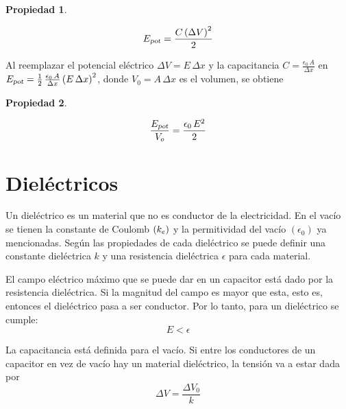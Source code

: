 \documentclass[a5paper,12pt,twoside]{book}
\newtheorem{prop}{{Propiedad}}[chapter]
\begin{document}
\begin{mdframed}[style=MyFrame1]
    \begin{prop}
    \end{prop}
    \begin{equation*}
        {{E}_\textsl{{pot}}} = \frac{C \left(\Delta V\right)^2}{2}
    \end{equation*}
\end{mdframed}

Al reemplazar el potencial eléctrico $\Delta V = E \, \Delta x$ y la capacitancia $C = \tfrac{\epsilon_0 \, A}{\Delta x}$ en ${{E}_\textsl{{pot}}} = \tfrac{1}{2} \, \tfrac{\epsilon_0 \, A}{\Delta x} \left(E \, \Delta x\right)^2$, donde $V_0 = A \, \Delta x$ es el volumen, se obtiene

\begin{mdframed}[style=MyFrame1]
    \begin{prop}
    \end{prop}
    \begin{equation*}
        \dfrac{{{E}_\textsl{{pot}}}}{V_o} = \frac{\epsilon_0 \, E^2}{2}
    \end{equation*}
\end{mdframed}


\section{Dieléctricos}

Un dieléctrico es un material que no es conductor de la electricidad. En el vacío se tienen la constante de Coulomb $(k_e)$ y la permitividad del vacío $(\epsilon_0)$ ya mencionadas. Según las propiedades de cada dieléctrico se puede definir una constante dieléctrica $k$ y una resistencia dieléctrica $\epsilon$ para cada material.

El campo eléctrico máximo que se puede dar en un capacitor está dado por la resistencia dieléctrica. Si la magnitud del campo es mayor que esta, esto es, entonces el dieléctrico pasa a ser conductor. Por lo tanto, para un dieléctrico se cumple:
\begin{equation*}
    E < \epsilon
\end{equation*}

La capacitancia está definida para el vacío. Si entre los conductores de un capacitor en vez de vacío hay un material dieléctrico, la tensión va a estar dada por
\begin{equation*}
    \Delta V = \frac{\Delta V_0}{k}
\end{equation*}
\end{document}
